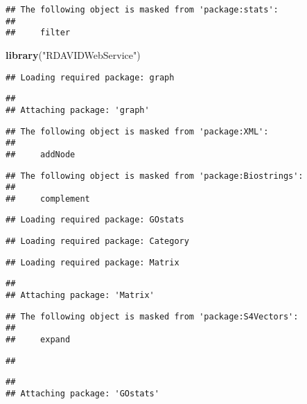 \documentclass[]{article}
\newenvironment{Shaded}{\begin{snugshade}}{\end{snugshade}}
\newcommand{\KeywordTok}[1]{\textcolor[rgb]{0.13,0.29,0.53}{\textbf{#1}}}
\newcommand{\StringTok}[1]{\textcolor[rgb]{0.31,0.60,0.02}{#1}}
\newcommand{\NormalTok}[1]{#1}
\begin{document}
\begin{verbatim}
## The following object is masked from 'package:stats':
## 
##     filter
\end{verbatim}

\begin{Shaded}
\begin{Highlighting}[]
\KeywordTok{library}\NormalTok{(}\StringTok{"RDAVIDWebService"}\NormalTok{)}
\end{Highlighting}
\end{Shaded}

\begin{verbatim}
## Loading required package: graph
\end{verbatim}

\begin{verbatim}
## 
## Attaching package: 'graph'
\end{verbatim}

\begin{verbatim}
## The following object is masked from 'package:XML':
## 
##     addNode
\end{verbatim}

\begin{verbatim}
## The following object is masked from 'package:Biostrings':
## 
##     complement
\end{verbatim}

\begin{verbatim}
## Loading required package: GOstats
\end{verbatim}

\begin{verbatim}
## Loading required package: Category
\end{verbatim}

\begin{verbatim}
## Loading required package: Matrix
\end{verbatim}

\begin{verbatim}
## 
## Attaching package: 'Matrix'
\end{verbatim}

\begin{verbatim}
## The following object is masked from 'package:S4Vectors':
## 
##     expand
\end{verbatim}

\begin{verbatim}
## 
\end{verbatim}

\begin{verbatim}
## 
## Attaching package: 'GOstats'
\end{verbatim}
\end{document}
